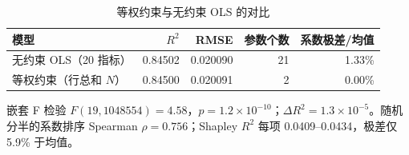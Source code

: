 \begin{table}[htbp]
\centering
\caption{等权约束与无约束 OLS 的对比}
\label{tab:p1equal}
\small
\begin{tabular}{lrrrr}
\toprule
模型 & $R^2$ & RMSE & 参数个数 & 系数极差/均值 \\
\midrule
无约束 OLS（20 指标） & 0.84502 & 0.020090 & 21 & 1.33\% \\
等权约束（行总和 $N$） & 0.84500 & 0.020091 & 2 & 0.00\% \\
\bottomrule
\end{tabular}
\par\vspace{2pt}\footnotesize 嵌套 F 检验 $F(19,1048554)=4.58$，$p=1.2\times10^{-10}$；$\Delta R^2=1.3\times10^{-5}$。随机分半的系数排序 Spearman $\rho=0.756$；Shapley $R^2$ 每项 0.0409–0.0434，极差仅 5.9\% 于均值。
\end{table}
